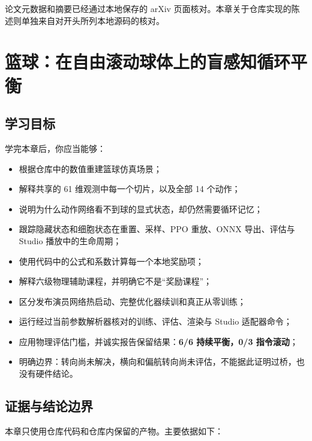 \documentclass[
  chinese,
  11pt,
  letterpaper,
]{article}
\providecommand{\tightlist}{%
  \setlength{\itemsep}{0pt}\setlength{\parskip}{0pt}}
\begin{document}
论文元数据和摘要已经通过本地保存的 arXiv
页面核对。本章关于仓库实现的陈述则单独来自对开头所列本地源码的核对。

\section{篮球：在自由滚动球体上的盲感知循环平衡}\label{ux7beeux7403ux5728ux81eaux7531ux6edaux52a8ux7403ux4f53ux4e0aux7684ux76f2ux611fux77e5ux5faaux73afux5e73ux8861}

\subsection{学习目标}\label{ux5b66ux4e60ux76eeux6807}

学完本章后，你应当能够：

\begin{itemize}
\tightlist
\item
  根据仓库中的数值重建篮球仿真场景；
\item
  解释共享的 61 维观测中每一个切片，以及全部 14 个动作；
\item
  说明为什么动作网络看不到球的显式状态，却仍然需要循环记忆；
\item
  跟踪隐藏状态和细胞状态在重置、采样、PPO 重放、ONNX 导出、评估与 Studio
  播放中的生命周期；
\item
  使用代码中的公式和系数计算每一个本地奖励项；
\item
  解释六级物理辅助课程，并明确它不是``奖励课程''；
\item
  区分发布演员网络热启动、完整优化器续训和真正从零训练；
\item
  运行经过当前参数解析器核对的训练、评估、渲染与 Studio 适配器命令；
\item
  应用物理评估门槛，并诚实报告保留结果：\textbf{6/6 持续平衡，0/3
  指令滚动}；
\item
  明确边界：转向尚未解决，横向和偏航转向尚未评估，不能据此证明过桥，也没有硬件结论。
\end{itemize}

\subsection{证据与结论边界}\label{ux8bc1ux636eux4e0eux7ed3ux8bbaux8fb9ux754c}

本章只使用仓库代码和仓库内保留的产物。主要依据如下：
\end{document}
